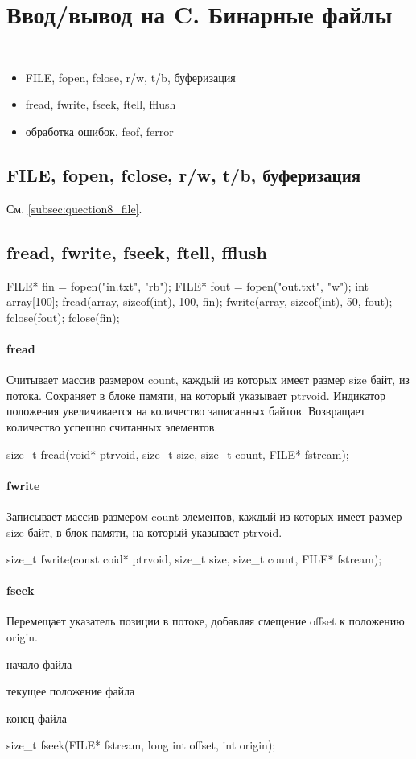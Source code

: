 \section{Ввод/вывод на C. Бинарные файлы}
{\tt
\begin{itemize}[noitemsep]
    \item FILE, fopen, fclose, r/w, t/b, буферизация
    \item fread, fwrite, fseek, ftell, fflush
    \item {\rm обработка ошибок}, feof, ferror
\end{itemize}
}

\subsection{FILE, fopen, fclose, r/w, t/b, буферизация} 
См. \ref{subsec:quection8_file}.
\subsection{fread, fwrite, fseek, ftell, fflush}
\begin{ccode}
FILE* fin = fopen("in.txt", "rb");
FILE* fout = fopen("out.txt", "w");
int array[100];
fread(array, sizeof(int), 100, fin);
fwrite(array, sizeof(int), 50, fout);
fclose(fout);
fclose(fin);
\end{ccode}
\paragraph{fread}
Считывает массив размером count, каждый из которых имеет размер  size байт, из потока. Сохраняет в блоке памяти, на который указывает ptrvoid. Индикатор положения увеличивается на количество записанных байтов. Возвращает количество успешно считанных элементов.
\begin{ccode}
size_t fread(void* ptrvoid, size_t size, size_t count, FILE* fstream);
\end{ccode}
\paragraph{fwrite}
Записывает массив размером count элементов, каждый из которых имеет размер size байт, в блок памяти, на который указывает ptrvoid.
\begin{ccode}
size_t fwrite(const coid* ptrvoid, size_t size, size_t count, FILE* fstream);
\end{ccode}
\paragraph{fseek}
Перемещает указатель позиции в потоке, добавляя смещение offset к положению origin.
\begin{description}[noitemsep]
    \item[SEEK\_SET] начало файла
    \item[SEEK\_CUR] текущее положение файла
    \item[SEEK\_END] конец файла
\end{description}
\begin{ccode}
size_t fseek(FILE* fstream, long int offset, int origin);
\end{ccode}
